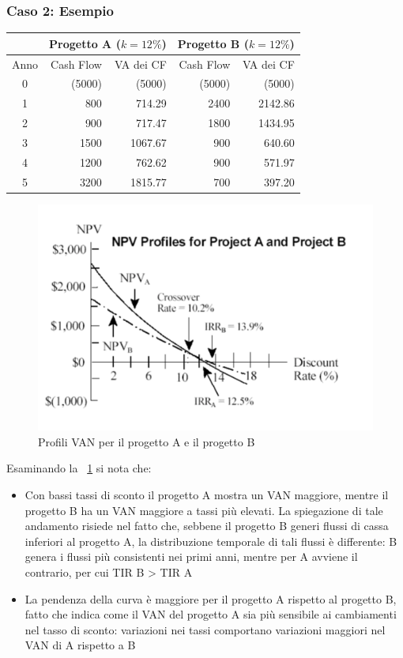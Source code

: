 \subsubsection{Caso 2: Esempio}
\begin{tabular}{|c|r|r|r|r|}
	\hline
	\grayrow & \multicolumn{2}{l|}{Progetto A ($k = 12\%$)} & \multicolumn{2}{l|}{Progetto B ($k = 12\%$)}  \\
	\hline
	\grayrow Anno & Cash Flow & VA dei CF & Cash Flow & VA dei CF \\
	\hline
	0 & (5000) & (5000) & (5000) & (5000) \\
	\hline
	1 & 800 & 714.29 & 2400 & 2142.86 \\
	\hline
	2 & 900 & 717.47 & 1800 & 1434.95 \\
	\hline
	3 & 1500 & 1067.67 & 900 & 640.60 \\
	\hline
	4 & 1200 & 762.62 & 900 & 571.97 \\
	\hline
	5 & 3200 & 1815.77 & 700 & 397.20 \\
	\hline
\end{tabular}

\begin{figure}
	\centering
	\includegraphics[width=0.5\linewidth]{images/van_vs_tir}
	\caption{Profili VAN per il progetto A e il progetto B}
	\label{fig:vanvstir}
\end{figure}

\vspace{1em}
Esaminando la \figurename ~\ref{fig:vanvstir} si nota che:
\begin{itemize}
	\item Con bassi tassi di sconto il progetto A mostra un VAN maggiore, mentre il progetto B ha un VAN
	maggiore a tassi più elevati. La spiegazione di tale andamento risiede nel fatto che, sebbene il
	progetto B generi flussi di cassa inferiori al progetto A, la distribuzione temporale di tali flussi è
	differente: B genera i flussi più consistenti nei primi anni, mentre per A avviene il contrario, per cui
	TIR B > TIR A
	\item La pendenza della curva è maggiore per il progetto A rispetto al progetto B, fatto che indica come il
	VAN del progetto A sia più sensibile ai cambiamenti nel tasso di sconto: variazioni nei tassi comportano variazioni maggiori nel VAN di A rispetto a B
\end{itemize}

